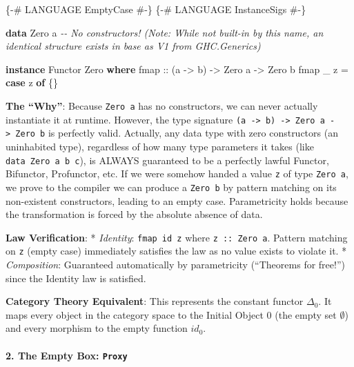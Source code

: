 \documentclass[
]{article}
\newenvironment{Shaded}{}{}
\newcommand{\CommentTok}[1]{\textcolor[rgb]{0.38,0.63,0.69}{\textit{#1}}}
\newcommand{\DataTypeTok}[1]{\textcolor[rgb]{0.56,0.13,0.00}{#1}}
\newcommand{\FunctionTok}[1]{\textcolor[rgb]{0.02,0.16,0.49}{#1}}
\newcommand{\KeywordTok}[1]{\textcolor[rgb]{0.00,0.44,0.13}{\textbf{#1}}}
\newcommand{\NormalTok}[1]{#1}
\newcommand{\OtherTok}[1]{\textcolor[rgb]{0.00,0.44,0.13}{#1}}
\begin{document}
\begin{Shaded}
\begin{Highlighting}[]
\OtherTok{\{{-}\# LANGUAGE EmptyCase \#{-}\}}
\OtherTok{\{{-}\# LANGUAGE InstanceSigs \#{-}\}}

\KeywordTok{data} \DataTypeTok{Zero}\NormalTok{ a }\CommentTok{{-}{-} No constructors! (Note: While not built{-}in by this name, an identical structure exists in base as \textasciigrave{}V1\textasciigrave{} from \textasciigrave{}GHC.Generics\textasciigrave{})}

\KeywordTok{instance} \DataTypeTok{Functor} \DataTypeTok{Zero} \KeywordTok{where}
\OtherTok{    fmap ::}\NormalTok{ (a }\OtherTok{{-}\textgreater{}}\NormalTok{ b) }\OtherTok{{-}\textgreater{}} \DataTypeTok{Zero}\NormalTok{ a }\OtherTok{{-}\textgreater{}} \DataTypeTok{Zero}\NormalTok{ b}
    \FunctionTok{fmap}\NormalTok{ \_ z }\OtherTok{=} \KeywordTok{case}\NormalTok{ z }\KeywordTok{of}\NormalTok{ \{\} }
\end{Highlighting}
\end{Shaded}

\textbf{The ``Why''}: Because \texttt{Zero\ a} has no constructors, we
can never actually instantiate it at runtime. However, the type
signature
\texttt{(a\ -\textgreater{}\ b)\ -\textgreater{}\ Zero\ a\ -\textgreater{}\ Zero\ b}
is perfectly valid. Actually, any data type with zero constructors (an
uninhabited type), regardless of how many type parameters it takes (like
\texttt{data\ Zero\ a\ b\ c}), is ALWAYS guaranteed to be a perfectly
lawful Functor, Bifunctor, Profunctor, etc. If we were somehow handed a
value \texttt{z} of type \texttt{Zero\ a}, we prove to the compiler we
can produce a \texttt{Zero\ b} by pattern matching on its non-existent
constructors, leading to an empty case. Parametricity holds because the
transformation is forced by the absolute absence of data.

\textbf{Law Verification}: * \emph{Identity}: \texttt{fmap\ id\ z} where
\texttt{z\ ::\ Zero\ a}. Pattern matching on \texttt{z} (empty case)
immediately satisfies the law as no value exists to violate it. *
\emph{Composition}: Guaranteed automatically by parametricity
(``Theorems for free!'') since the Identity law is satisfied.

\textbf{Category Theory Equivalent}: This represents the constant
functor \(\Delta_0\). It maps every object in the category space to the
Initial Object \(0\) (the empty set \(\emptyset\)) and every morphism to
the empty function \(id_0\).

\paragraph{\texorpdfstring{2. The Empty Box:
\texttt{Proxy}}{2. The Empty Box: Proxy}}\label{the-empty-box-proxy}
\end{document}
